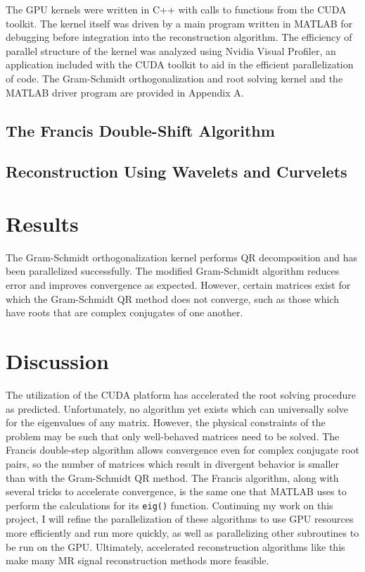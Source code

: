 \documentclass{article}
\begin{document}
The GPU kernels were written in C++ with calls to functions from the CUDA toolkit. The kernel itself was driven by a main program written in MATLAB for debugging before integration into the reconstruction algorithm. The efficiency of parallel structure of the kernel was analyzed using Nvidia Visual Profiler, an application included with the CUDA toolkit to aid in the efficient parallelization of code. The Gram-Schmidt orthogonalization and root solving kernel and the MATLAB driver program are provided in Appendix A.

\subsection*{The Francis Double-Shift Algorithm}

\subsection*{Reconstruction Using Wavelets and Curvelets}

\section*{Results}

The Gram-Schmidt orthogonalization kernel performs QR decomposition and has been parallelized successfully. The modified Gram-Schmidt algorithm reduces error and improves convergence as expected. However, certain matrices exist for which the Gram-Schmidt QR method does not converge, such as those which have roots that are complex conjugates of one another. 

\section*{Discussion}

The utilization of the CUDA platform has accelerated the root solving procedure as predicted. Unfortunately, no algorithm yet exists which can universally solve for the eigenvalues of any matrix. However, the physical constraints of the problem may be such that only well-behaved matrices need to be solved. The Francis double-step algorithm allows convergence even for complex conjugate root pairs, so the number of matrices which result in divergent behavior is smaller than with the Gram-Schmidt QR method. The Francis algorithm, along with several tricks to accelerate convergence, is the same one that MATLAB uses to perform the calculations for its \texttt{eig()} function. Continuing my work on this project, I will refine the parallelization of these algorithms to use GPU resources more efficiently and run more quickly, as well as parallelizing other subroutines to be run on the GPU. Ultimately, accelerated reconstruction algorithms like this make many MR signal reconstruction methods more feasible.
\end{document}
